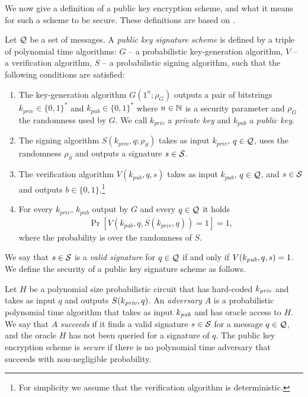 We now give a definition of a public key encryption scheme, and what it means for such a scheme to be secure.
These definitions are based on \cite{Goldreich:2004:FCV:975541}.

\begin{definition}
Let $\mathcal{Q}$ be a set of messages. A \textit{public key signature scheme} is defined by a triple of polynomial time algorithms:
$G$ -- a probabilistic key-generation algorithm,
$V$ -- a verification algorithm,
$S$ -- a probabilistic signing algorithm,
such that the following conditions are satisfied:
\begin{enumerate}[-]
  \item The key-generation algorithm $G(1^n; \rho_G)$ outputs a pair of bitstrings $k_{\mathit{priv}} \in \{0,1\}^{*}$ and $k_{\mathit{pub}} \in \{0,1\}^{*}$ where $n \in \mathbb{N}$ is a security
    parameter and $\rho_G$ the randomness used by $G$. We call $k_{\mathit{priv}}$ a \textit{private key} and $k_{\mathit{pub}}$ a \textit{public key}.
  \item The signing algorithm $S(k_{\mathit{priv}}, q; \rho_S)$ takes as input $k_{\mathit{priv}}$, $q \in \mathcal{Q}$, uses the randomness $\rho_S$ and outputs a signature $s \in \mathcal{S}$.
  \item The verification algorithm $V(k_{\mathit{pub}}, q, s)$ takes as input $k_{\mathit{pub}}$, $q \in \mathcal{Q}$, and $s \in \mathcal{S}$ and outputs $b \in \{0,1\}$.\footnote{For simplicity we assume that the verification
algorithm is deterministic.}
  \item For every $k_{\mathit{priv}}$, $k_{\mathit{pub}}$ output by $G$ and every $q \in \mathcal{Q}$ it holds
    \begin{align*}
      \Pr[V(k_{\mathit{pub}}, q, S(k_{\mathit{priv}}, q)) = 1] = 1,
    \end{align*}
    where the probability is over the randomness of $S$.
\end{enumerate}
\end{definition}
We say that $s \in \mathcal{S}$ is a \textit{valid signature} for $q \in \mathcal{Q}$ if and only if $V(k_{\operatorname{\mathit{pub}}}, q, s) = 1$.
We define the security of a public key signature scheme as follows.
%
\begin{definition}
  \label{def:sec_sig}
Let $H$ be a polynomial size probabilistic circuit that has hard-coded $k_{\operatorname{\mathit{priv}}}$ and takes as input $q$ and outputs $S(k_{\operatorname{\mathit{priv}}}, q)$.
An \textit{adversary} $A$ is a probabilistic polynomial time algorithm that takes as input $k_{\operatorname{\mathit{pub}}}$ and has oracle access to $H$.
We say that $A$ \textit{succeeds} if it finds a valid signature $s \in \mathcal{S}$ for a message $q \in \mathcal{Q}$, and the oracle $H$ has not been queried for a signature of $q$.
The public key encryption scheme is \textit{secure} if there is no polynomial time adversary that succeeds with non-negligible probability.
\end{definition}
